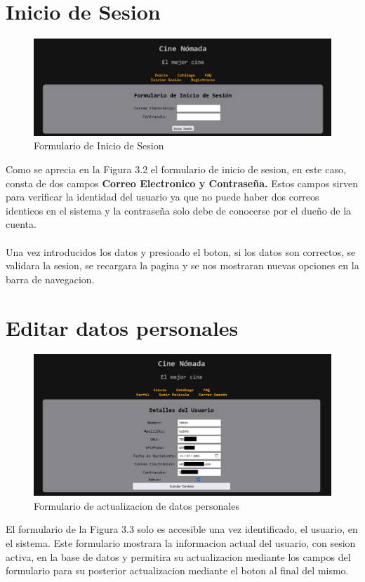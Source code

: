 \documentclass{report}
\begin{document}
        \section{Inicio de Sesion}
            \begin{figure}[h!]
                \centering
                \includegraphics[width=\textwidth]{./img/ui/login.png}
                \caption{Formulario de Inicio de Sesion}
            \end{figure}
            Como se aprecia en la Figura 3.2 el formulario de inicio de sesion, en este caso, consta de dos campos \textbf{Correo Electronico y Contraseña.} Estos campos sirven para verificar la identidad del usuario ya que no puede haber dos correos identicos en el sistema y la contraseña solo debe de conocerse por el dueño de la cuenta.
            \\\\
            Una vez introducidos los datos y presioado el boton, si los datos son correctos, se validara la sesion, se recargara la pagina y se nos mostraran nuevas opciones en la barra de navegacion.

        \clearpage
        \section{Editar datos personales}
            \begin{figure}[h!]
                \centering
                \includegraphics[width=\textwidth]{./img/ui/perfil.png}
                \caption{Formulario de actualizacion de datos personales}
            \end{figure}
            El formulario de la Figura 3.3 solo es accesible una vez identificado, el usuario, en el sistema. Este formulario mostrara la informacion actual del usuario, con sesion activa, en la base de datos y permitira su actualizacion mediante los campos del formulario para su posterior actualizacion mediante el boton al final del mismo.
\end{document}
